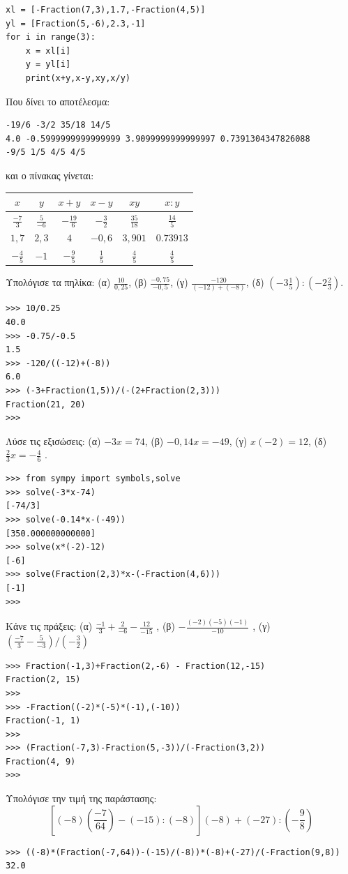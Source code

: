 \begin{lstlisting}
xl = [-Fraction(7,3),1.7,-Fraction(4,5)]
yl = [Fraction(5,-6),2.3,-1]
for i in range(3):
    x = xl[i]
    y = yl[i]
    print(x+y,x-y,xy,x/y)
\end{lstlisting}
Που δίνει το αποτέλεσμα:
\begin{lstlisting}
-19/6 -3/2 35/18 14/5
4.0 -0.5999999999999999 3.9099999999999997 0.7391304347826088
-9/5 1/5 4/5 4/5
\end{lstlisting}
και ο πίνακας γίνεται:
\begin{table}[h]
\begin{tabular}{|c|c|c|c|c|c|}
\hline
$x$&$y$&$x+y$&$x-y$&$xy$&$x:y$\\\hline
$\frac{-7}{3}$&$\frac{5}{-6}$&$-\frac{19}{6}$ & $-\frac{3}{2}$ &$\frac{35}{18}$ & $\frac{14}{5}$\\\hline
$1,7$&$2,3$&$4$&$-0,6$ &$3,901$ & $0.73913$\\\hline
$-\frac{4}{5}$&$-1$&$-\frac{9}{5}$&$\frac{1}{5}$&$\frac{4}{5}$ & $\frac{4}{5}$ \\\hline
\end{tabular}
\end{table}
\begin{exercise}
 Υπολόγισε τα πηλίκα:
(α) $\frac{10}{0,25}$, (β) $\frac{-0,75}{-0,5}$, (γ) $\frac{-120}{(-12)+(-8)}$, (δ) $\left(-3\frac{1}{5}\right):\left(-2\frac{2}{3}\right)$.
\end{exercise}
\begin{lstlisting}
>>> 10/0.25
40.0
>>> -0.75/-0.5
1.5
>>> -120/((-12)+(-8))
6.0
>>> (-3+Fraction(1,5))/(-(2+Fraction(2,3)))
Fraction(21, 20)
>>>
\end{lstlisting}
\begin{exercise}
Λύσε	τις	εξισώσεις:	(α)	$-3x	=	74$,	(β)	$-0,14x	=	-49$,	(γ)	$x(-2)	=	12$,	(δ)	 $\frac{2}{3}x	=	- \frac{4}{6}$ .
\end{exercise}
\begin{lstlisting}
>>> from sympy import symbols,solve
>>> solve(-3*x-74)
[-74/3]
>>> solve(-0.14*x-(-49))
[350.000000000000]
>>> solve(x*(-2)-12)
[-6]
>>> solve(Fraction(2,3)*x-(-Fraction(4,6)))
[-1]
>>>
\end{lstlisting}
\begin{exercise}
Kάνε	τις	πράξεις:	(α)	$\frac{-1}{3}+\frac{2}{-6} - \frac{12}{-15}$ ,		(β)	$-\frac{ (-2)(-5)(-1)}{-10}$ , (γ)	$\left( \frac{-7}{3}-\frac{5}{-3}\right)/\left(-\frac{3}{2}\right)$
\end{exercise}
\begin{lstlisting}
>>> Fraction(-1,3)+Fraction(2,-6) - Fraction(12,-15)
Fraction(2, 15)
>>>
>>> -Fraction((-2)*(-5)*(-1),(-10))
Fraction(-1, 1)
>>>
>>> (Fraction(-7,3)-Fraction(5,-3))/(-Fraction(3,2))
Fraction(4, 9)
>>>
\end{lstlisting}
\begin{exercise}
Υπολόγισε	την	τιμή	της	παράστασης:	
$$\left[(-8)\left(\frac{-7}{64}\right)-(-15)	:	(-8)\right](-8)+(-27):(-\frac{9}{8})$$
\end{exercise}
\begin{lstlisting}
>>> ((-8)*(Fraction(-7,64))-(-15)/(-8))*(-8)+(-27)/(-Fraction(9,8))
32.0
\end{lstlisting}
